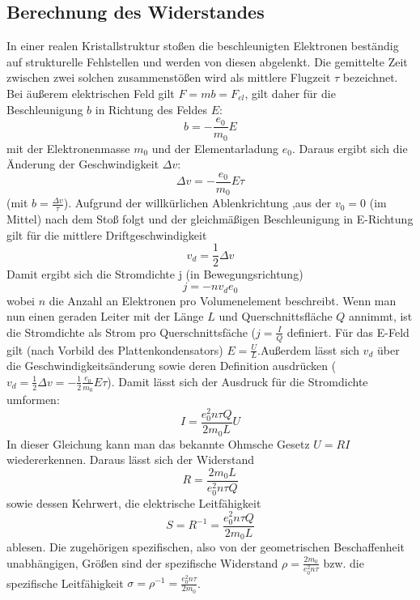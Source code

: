 \subsection{Berechnung des Widerstandes}
In einer realen Kristallstruktur stoßen die beschleunigten Elektronen beständig auf strukturelle Fehlstellen und werden von diesen abgelenkt. Die gemittelte Zeit zwischen zwei solchen zusammenstößen wird als mittlere Flugzeit $\tau$ bezeichnet.       
Bei äußerem elektrischen Feld gilt $F=mb=F_{el}$, gilt daher für die Beschleunigung $b$ in Richtung des Feldes $E$:
\begin{equation*}
b=-\frac{e_0}{m_0}E
\end{equation*}
mit der Elektronenmasse $m_0$ und der Elementarladung $e_0$. Daraus ergibt sich die Änderung der Geschwindigkeit $\Delta v$:
\begin{equation}
   \label{eq:deltaV}
\Delta v=-\frac{e_0}{m_0}E\tau
\end{equation}
(mit $b=\frac{\Delta v}{\tau}$). Aufgrund der willkürlichen Ablenkrichtung ,aus der  $v_0=0$ (im Mittel) nach dem Stoß folgt und der gleichmäßigen Beschleunigung in E-Richtung gilt für die mittlere Driftgeschwindigkeit
\begin{equation}
   \label{eq:vd}
v_d=\frac{1}{2}\Delta v
\end{equation} 
Damit ergibt sich die Stromdichte j (in Bewegungsrichtung) 
\begin{equation}
   \label{eq:drift}
j=-nv_de_0
\end{equation}
wobei $n$ die Anzahl an Elektronen pro Volumenelement beschreibt. Wenn man nun einen geraden Leiter mit der Länge $L$ und Querschnittsfläche $Q$ annimmt, ist die Stromdichte als Strom pro Querschnittsfäche ($j=\frac{I}{Q}$ definiert. Für das E-Feld gilt (nach Vorbild des Plattenkondensators) $E=\frac{U}{L}$.Außerdem lässt sich $v_d$ über die Geschwindigkeitsänderung sowie deren Definition ausdrücken ($v_d=\frac{1}{2}\Delta v=-\frac{1}{2}\frac{e_0}{m_0}E\tau$). Damit lässt sich der Ausdruck für die Stromdichte umformen:
\begin{equation}
I=\frac{e_0^2n\tau Q}{2m_0L}U
\end{equation}
In dieser Gleichung kann man das bekannte Ohmsche Gesetz $U=RI$ wiedererkennen. Daraus lässt sich der Widerstand
\begin{equation}
   \label{eq:widerstand}
R=\frac{2m_0L}{e_0^2n\tau Q}
\end{equation}
sowie dessen Kehrwert, die elektrische Leitfähigkeit
\begin{equation}
S=R^{-1}=\frac{e_0^2n\tau Q}{2m_0L}
\end{equation}
ablesen. Die zugehörigen spezifischen, also von der geometrischen Beschaffenheit unabhängigen, Größen sind der spezifische Widerstand $\rho=\frac{2m_0}{e_0^2n\tau}$ bzw. die spezifische Leitfähigkeit $\sigma=\rho^{-1}=\frac{e_0^2n\tau}{2m_0}$.

